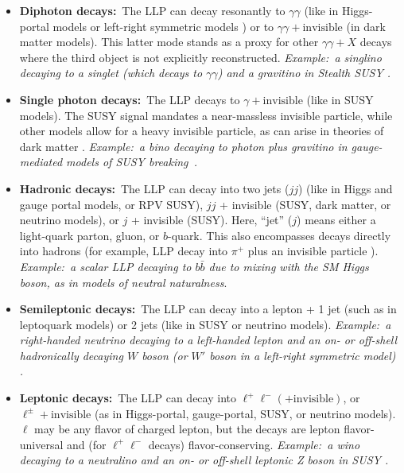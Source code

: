 \begin{itemize}
\item {\bf Diphoton decays:}~The LLP can decay resonantly to
  $\gamma\gamma$ (like in Higgs-portal models or left-right symmetric models
  \cite{Dev:2016vle}) or to
  $\gamma\gamma+\mathrm{invisible}$ (in dark matter models). This
  latter mode stands as a proxy for other $\gamma\gamma+X$ decays
  where the third object is not explicitly reconstructed. \emph{Example:~a 
  singlino decaying to a singlet (which decays to $\gamma\gamma$) and 
  a gravitino in Stealth SUSY \cite{Fan:2011yu}.}

\item {\bf Single photon decays:}~The LLP decays to
  $\gamma+\mathrm{invisible}$ (like in SUSY models).  The SUSY signal mandates a
  near-massless invisible particle, while other models allow for
  a heavy invisible particle, as can arise in theories of dark matter
  \cite{Weiner:2012cb,Primulando:2015lfa}. \emph{Example:~a bino decaying to photon plus gravitino in gauge-mediated
  models of SUSY breaking~\cite{Dimopoulos:1996yq}.}

\item {\bf Hadronic decays:}~The LLP can decay into two jets ($jj$)
  (like in Higgs and gauge portal models, or RPV SUSY), $jj$ +
  invisible (SUSY, dark matter, or neutrino models), or $j$ +
  invisible (SUSY). Here, ``jet'' ($j$) means either a light-quark parton,
  gluon, or $b$-quark. This also encompasses decays directly into
  hadrons (for example, LLP decay into $\pi^+$ plus an invisible 
  particle  \cite{Chen:1995yu,Thomas:1998wy,Feng:1999fu}).
   \emph{Example:~a scalar LLP decaying to $b\bar{b}$
  due to mixing with the SM Higgs boson, as in models of
  neutral naturalness}. 

\item {\bf Semileptonic decays:}~The LLP can decay into a lepton + 1 jet (such as in leptoquark models)
  or 2 jets (like in SUSY or neutrino models). \emph{Example:~a right-handed neutrino decaying to a left-handed
   lepton and an on- or off-shell hadronically decaying $W$ boson (or $W'$ boson in a left-right
   symmetric model) \cite{Keung:1983uu}. }

\item {\bf Leptonic decays:}~The LLP can decay into
  $\ell^+\ell^-(+\mathrm{invisible})$, or
  $\ell^\pm+\mathrm{invisible}$ (as in Higgs-portal, gauge-portal,
  SUSY, or neutrino models). $\ell$ may be any flavor of charged
  lepton, but the decays are lepton flavor-universal and (for
  $\ell^+\ell^-$ decays) flavor-conserving. \emph{Example:~a wino decaying
  to a neutralino and an on- or off-shell leptonic Z boson in SUSY \cite{Barbier:2004ez}.}


\end{itemize}

